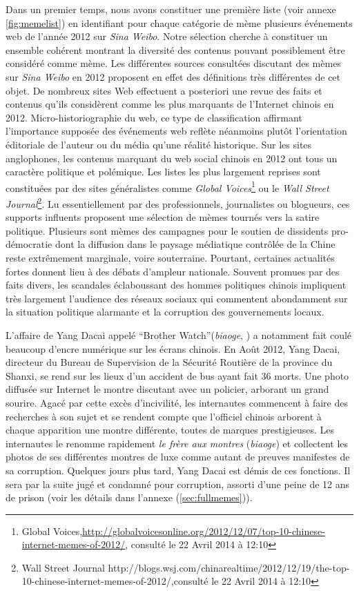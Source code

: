 Dans un premier temps, nous avons constituer une première liste (voir annexe \ref{fig:memelist}) en identifiant pour chaque catégorie de mème plusieurs événements web de l{\textquoteright}année 2012 sur \textit{Sina Weibo}. Notre sélection cherche à constituer un ensemble cohérent montrant la diversité des contenus pouvant possiblement être considéré comme mème. Les différentes sources consultées discutant des mèmes sur \textit{Sina Weibo} en 2012 proposent en effet des définitions très différentes de cet objet. De nombreux sites Web effectuent a posteriori une revue des faits et contenus qu'ils considèrent comme les plus marquants de l'Internet chinois en 2012. Micro-historiographie du web, ce type de classification affirmant l'importance supposée des événements web reflète néanmoins plutôt l'orientation éditoriale de l'auteur ou du média qu'une réalité historique. Sur les sites anglophones, les contenus marquant du web social chinois en 2012 ont tous un caractère politique et polémique. Les listes les plus largement reprises sont constituées par des sites généralistes comme \textit{Global Voices}\footnote{Global Voices,\url{http://globalvoicesonline.org/2012/12/07/top-10-chinese-internet-memes-of-2012/}, consulté le 22 Avril 2014 à 12:10} ou le \textit{Wall Street Journal}\footnote{ Wall Street Journal http://blogs.wsj.com/chinarealtime/2012/12/19/the-top-10-chinese-internet-memes-of-2012/,consulté le 22 Avril 2014 à 12:10}. Lu essentiellement par des professionnels, journalistes ou blogueurs, ces supports influents proposent une sélection de mèmes tournés vers la satire politique. Plusieurs sont mèmes des campagnes pour le soutien de dissidents pro-démocratie dont la diffusion dans le paysage médiatique contrôlée de la Chine reste extrêmement marginale, voire souterraine. Pourtant, certaines actualités fortes donnent lieu à des débats d'ampleur nationale. Souvent promues par des faits divers, les scandales éclaboussant des hommes politiques chinois impliquent très largement l'audience des réseaux sociaux qui commentent abondamment sur la situation politique alarmante et la corruption des gouvernements locaux. 

L'affaire de Yang Dacai appelé ``Brother Watch''(\textit{biaoge}, ) a notamment fait coulé beaucoup d'encre numérique sur les écrans chinois. En Août 2012, Yang Dacai, directeur du Bureau de Supervision de la Sécurité Routière de la province du Shanxi, se rend sur les lieux d'un accident de bus ayant fait 36 morts. Une photo diffusée sur Internet le montre discutant avec un policier, arborant un grand sourire. Agacé par cette excès d'incivilité, les internautes commencent à faire des recherches à son sujet et se rendent compte que l'officiel chinois arborent à chaque apparition une montre différente, toutes de marques prestigieuses. Les internautes le renomme rapidement \textit{le frère aux montres} (\textit{biaoge}) et collectent les photos de ses différentes montres de luxe comme autant de preuves manifestes de sa corruption. Quelques jours plus tard, Yang Dacai est démis de ces fonctions. Il sera par la suite jugé et condamné pour corruption, assorti d'une peine de 12 ans de prison (voir les détails dans l'annexe (\ref{sec:fullmemes})). 

